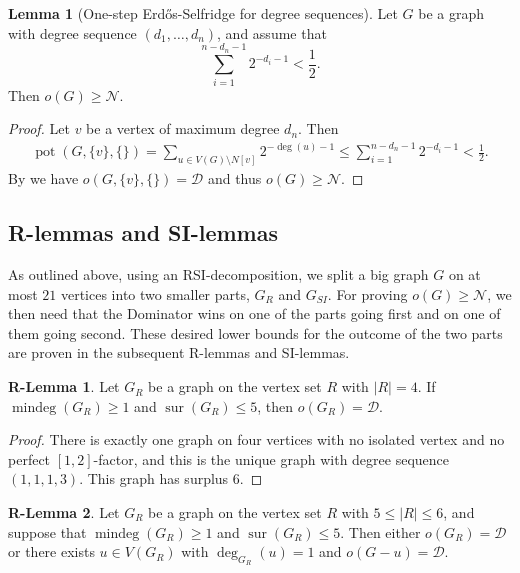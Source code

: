 \documentclass[a4paper,11pt,oneside]{scrartcl}
\theoremstyle{definition}
\newtheorem{lemma}[definition]{Lemma}
\newtheorem{r-lemma}{R-Lemma}
\theoremstyle{remark}
\DeclareMathOperator{\mindeg}{mindeg}
\DeclareMathOperator{\sur}{sur}
\DeclareMathOperator{\pot}{pot}
\begin{document}
\begin{lemma}[One-step Erd\H os-Selfridge for degree sequences]\label{lemma:one_step_deg_seq}
    Let $G$ be a graph with degree sequence $(d_1,\dots,d_n)$, and assume that 
    \[\sum_{i=1}^{n-d_n-1} 2^{-d_i-1} < \frac 12.\]
    Then $o(G) \geq \mathcal N$. 
\end{lemma}

\begin{proof}
    Let $v$ be a vertex of maximum degree $d_n$. Then 
    \begin{align*}
        \pot(G, \{v\}, \{\}) = \sum_{u \in V(G) \setminus N[v]} 2^{-\deg(u)-1} \leq \sum_{i=1}^{n-d_n-1} 2^{-d_i-1} < \frac 12.
    \end{align*}
    By  we have $o(G, \{v\},\{\}) = \mathcal D$ and thus $o(G) \geq \mathcal N$. 
\end{proof} 

\subsection*{R-lemmas and SI-lemmas}

As outlined above, using an RSI-decomposition, we split a big graph $G$ on at most $21$ vertices into two smaller parts, $G_R$ and $G_{SI}$. For proving $o(G) \geq \mathcal N$, we then need that the Dominator wins on one of the parts going first and on one of them going second. These desired lower bounds for the outcome of the two parts are proven in the subsequent R-lemmas and SI-lemmas.

\begin{r-lemma}\label{r-lemma:R_4}
    Let $G_{R}$ be a graph on the vertex set $R$ with $|R| = 4$. If $\mindeg(G_R) \geq 1$ and $\sur(G_R) \leq 5$, then $o(G_R) = \mathcal D$. 
\end{r-lemma}

\begin{proof}
    There is exactly one graph on four vertices with no isolated vertex and no perfect $[1,2]$-factor, and this is the unique graph with degree sequence $(1,1,1,3)$. This graph has surplus $6$.
\end{proof}

\begin{r-lemma}\label{r-lemma:R_5_6}
    Let $G_{R}$ be a graph on the vertex set $R$ with $5 \leq |R| \leq 6$, and suppose that $\mindeg(G_R) \geq 1$ and $\sur(G_R) \leq 5$. Then either $o(G_R) = \mathcal D$ or there exists $u \in V(G_R)$ with $\deg_{G_R}(u) = 1$ and $o(G-u) = \mathcal D$.
\end{r-lemma}
\end{document}
